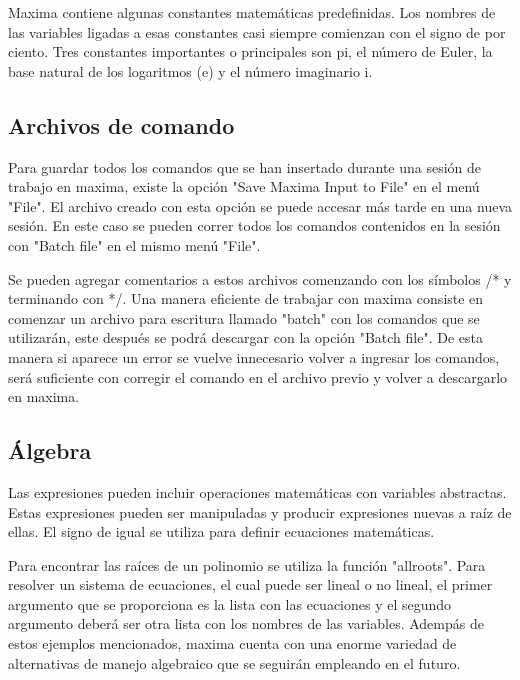 \documentclass{article} %
\begin{document}
Maxima contiene algunas constantes matemáticas predefinidas. Los nombres de las variables ligadas a esas constantes casi siempre comienzan con el signo de por ciento. Tres constantes importantes o principales son pi, el número de Euler, la base natural de los logaritmos (e) y el número imaginario i. 

\subsection{Archivos de comando}

Para guardar todos los comandos que se han insertado durante una sesión de trabajo en maxima, existe la opción "Save Maxima Input to File" en el menú "File". El archivo creado con esta opción se puede accesar más tarde en una nueva sesión. En este caso se pueden correr todos los comandos contenidos en la sesión con "Batch file" en el mismo menú "File".

\vspace{0.5 cm}

Se pueden agregar comentarios a estos archivos comenzando con los símbolos /* y terminando con */. Una manera eficiente de trabajar con maxima consiste en comenzar un archivo para escritura llamado "batch" con los comandos que se utilizarán, este después se podrá descargar con la opción "Batch file". De esta manera si aparece un error se vuelve innecesario volver a ingresar los comandos, será suficiente con corregir el comando en el archivo previo y volver a descargarlo en maxima. 

\subsection{Álgebra}

Las expresiones pueden incluir operaciones matemáticas con variables abstractas. Estas expresiones pueden ser manipuladas y producir expresiones nuevas a raíz de ellas. El signo de igual se utiliza para definir ecuaciones matemáticas. 


\vspace{0.5 cm}

Para encontrar las raíces de un polinomio se utiliza la función "allroots". Para resolver un sistema de ecuaciones, el cual puede ser lineal o no lineal, el primer argumento que se proporciona es la lista con las ecuaciones y el segundo argumento deberá ser otra lista con los nombres de las variables. Adempás de estos ejemplos mencionados, maxima cuenta con una enorme variedad de alternativas de manejo algebraico que se seguirán empleando en el futuro. 
\end{document}
